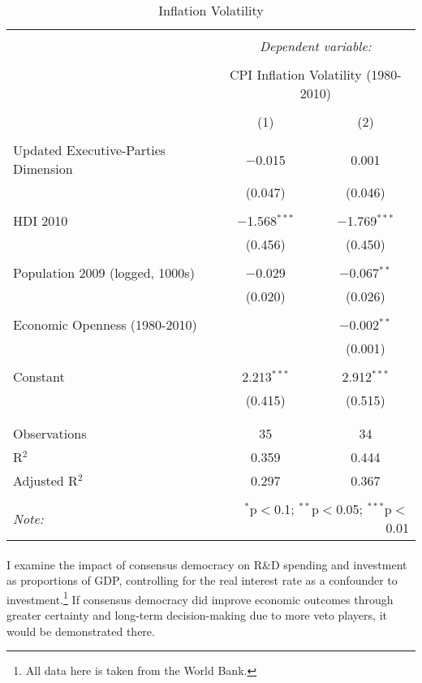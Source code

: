 \documentclass[11pt, oneside]{article}   	%
\let\oldparagraph\paragraph
\renewcommand{\paragraph}[1]{\oldparagraph{#1}\mbox{}}
\begin{document}
\begin{table}[!htbp] \centering 
  \caption{Inflation Volatility} 
  \label{} 
\small 
\begin{tabular}{@{\extracolsep{-15pt}}lcc} 
\\[-1.8ex]\hline 
\hline \\[-1.8ex] 
 & \multicolumn{2}{c}{\textit{Dependent variable:}} \\ 
\cline{2-3} 
\\[-1.8ex] & \multicolumn{2}{c}{CPI Inflation Volatility (1980-2010)} \\ 
\\[-1.8ex] & (1) & (2)\\ 
\hline \\[-1.8ex] 
 Updated Executive-Parties Dimension & $-$0.015 & 0.001 \\ 
  & (0.047) & (0.046) \\ 
  & & \\ 
 HDI 2010 & $-$1.568$^{***}$ & $-$1.769$^{***}$ \\ 
  & (0.456) & (0.450) \\ 
  & & \\ 
 Population 2009 (logged, 1000s) & $-$0.029 & $-$0.067$^{**}$ \\ 
  & (0.020) & (0.026) \\ 
  & & \\ 
 Economic Openness (1980-2010) &  & $-$0.002$^{**}$ \\ 
  &  & (0.001) \\ 
  & & \\ 
 Constant & 2.213$^{***}$ & 2.912$^{***}$ \\ 
  & (0.415) & (0.515) \\ 
  & & \\ 
\hline \\[-1.8ex] 
Observations & 35 & 34 \\ 
R$^{2}$ & 0.359 & 0.444 \\ 
Adjusted R$^{2}$ & 0.297 & 0.367 \\ 
\hline 
\hline \\[-1.8ex] 
\textit{Note:}  & \multicolumn{2}{r}{$^{*}$p$<$0.1; $^{**}$p$<$0.05; $^{***}$p$<$0.01} \\ 
\end{tabular} 
\end{table} 

\paragraph{}
I examine the impact of consensus democracy on R\&D spending and investment as proportions of GDP, controlling for the real interest rate as a confounder to investment.\footnote{  All data here is taken from the World Bank.} If consensus democracy did improve economic outcomes through greater certainty and long-term decision-making due to more veto players, it would be demonstrated there.
\end{document}
